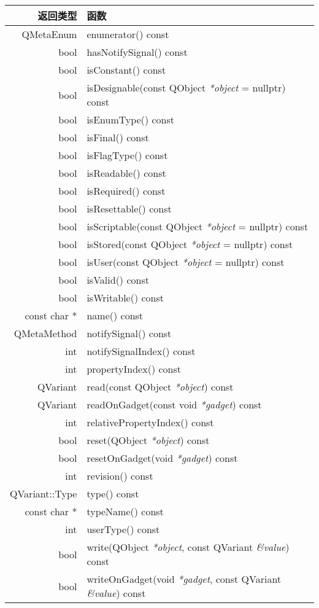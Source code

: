 \begin{longtable}[l]{|r|m{28em}|}   
\hline
返回类型 	& 函数 \\
\hline
QMetaEnum &	enumerator() const \\
\hline 
bool &	hasNotifySignal() const \\ 
\hline
bool &	isConstant() const \\ 
\hline
bool &	isDesignable(const QObject \emph{*object} = nullptr) const \\
\hline
bool &	isEnumType() const \\
\hline
bool 	&isFinal() const \\ 
\hline
bool 	&isFlagType() const \\ 
\hline
bool &	isReadable() const \\ 
\hline
bool &	isRequired() const\\
\hline
bool &	isResettable() const\\
\hline
bool &	isScriptable(const QObject \emph{*object} = nullptr) const\\
\hline
bool 	&isStored(const QObject \emph{*object} = nullptr) const\\
\hline
bool 	&isUser(const QObject \emph{*object} = nullptr) const\\
\hline
bool &	isValid() const\\
\hline
bool 	&isWritable() const\\
\hline
const char * &	name() const\\
\hline
QMetaMethod &	notifySignal() const\\
\hline
int 	& notifySignalIndex() const\\
\hline
int  &	propertyIndex() const\\
\hline
QVariant &	read(const QObject \emph{*object}) const \\
\hline
QVariant 	&readOnGadget(const void \emph{*gadget}) const \\
\hline
int 	&relativePropertyIndex() const\\
\hline
bool &	reset(QObject \emph{*object}) const\\
\hline
bool 	&resetOnGadget(void \emph{*gadget}) const \\
\hline
int 	&revision() const\\
\hline
QVariant::Type &	type() const \\
\hline
const char * &	typeName() const \\ 
\hline
int 	& userType() const \\ 
\hline
bool &	write(QObject \emph{*object}, const QVariant \emph{\&value}) const \\ 
\hline
bool 	&writeOnGadget(void \emph{*gadget}, const QVariant \emph{\&value}) const \\ 
\hline
\end{longtable}


